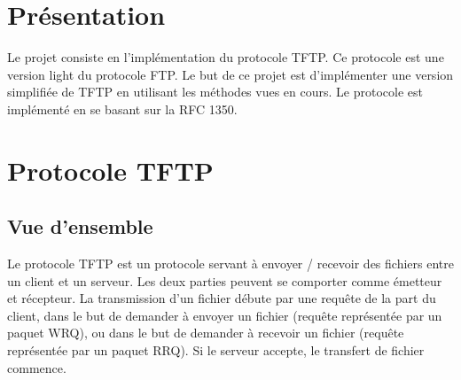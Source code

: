 \documentclass[11pt,a4paper]{article}
\title{\vartitle}
\author{\varauthor}
\date{\vardate}
\begin{document}
  \begin{titlepage}
    \maketitle

    \thispagestyle{empty}

    \begin{abstract}
    \begin{center}
    Ce rapport décrit l'implémentation du protocole TFTP dans le langage python. 
    \end{center}
    \end{abstract}

    \vspace{1cm}

    \tableofcontents

  \end{titlepage}


  \newpage


  \section{Présentation}

  \par Le projet consiste en l’implémentation du protocole TFTP. Ce protocole est une version light du protocole FTP. Le but de ce projet est d’implémenter une version simplifiée de TFTP en utilisant les méthodes vues en cours. Le protocole est implémenté en se basant sur la RFC 1350.

  \section{Protocole TFTP}
  
  \subsection{Vue d'ensemble}
  
  \par Le protocole TFTP est un protocole servant à envoyer / recevoir des fichiers entre un client et un serveur. Les deux parties peuvent se comporter comme émetteur et récepteur. La transmission d'un fichier débute par une requête de la part du client, dans le but de demander à envoyer un fichier (requête représentée par un paquet WRQ), ou dans le but de demander à recevoir un fichier (requête représentée par un paquet RRQ). Si le serveur accepte, le transfert de fichier commence. 
  
\end{document}
